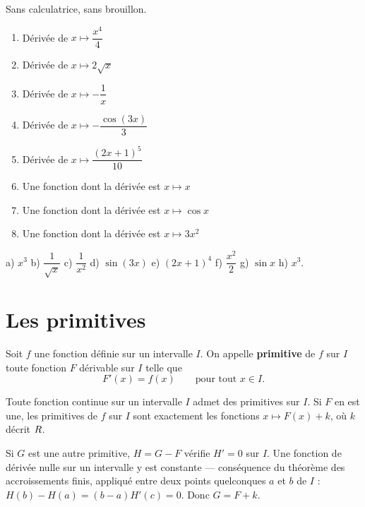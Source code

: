 \begin{automatismes}
Sans calculatrice, sans brouillon.

\begin{enumerate}[label=\textbf{\alph*)}, leftmargin=*, itemsep=0.25em]
  \item Dérivée de $x \mapsto \dfrac{x^{4}}{4}$
  \item Dérivée de $x \mapsto 2\sqrt{x}$
  \item Dérivée de $x \mapsto -\dfrac{1}{x}$
  \item Dérivée de $x \mapsto -\dfrac{\cos(3x)}{3}$
  \item Dérivée de $x \mapsto \dfrac{(2x+1)^{5}}{10}$
  \item Une fonction dont la dérivée est $x \mapsto x$
  \item Une fonction dont la dérivée est $x \mapsto \cos x$
  \item Une fonction dont la dérivée est $x \mapsto 3x^{2}$
\end{enumerate}
\end{automatismes}

\begin{corrige}[automatismes]
a) $x^{3}$ \quad b) $\dfrac{1}{\sqrt{x}}$ \quad c) $\dfrac{1}{x^{2}}$ \quad
d) $\sin(3x)$ \quad e) $(2x+1)^{4}$ \quad f) $\dfrac{x^{2}}{2}$ \quad
g) $\sin x$ \quad h) $x^{3}$.
\end{corrige}

\section{Les primitives}

\begin{definition}[primitive]
Soit $f$ une fonction définie sur un intervalle $I$. On appelle
\textbf{primitive} de $f$ sur $I$ toute fonction $F$ dérivable sur $I$ telle
que
\[
  F'(x) = f(x) \qquad \text{pour tout } x \in I .
\]
\end{definition}

\begin{theoreme}
Toute fonction continue sur un intervalle $I$ admet des primitives sur $I$.
Si $F$ en est une, les primitives de $f$ sur $I$ sont exactement les
fonctions $x \mapsto F(x)+k$, où $k$ décrit $R$.
\end{theoreme}

\begin{demonstration}
Si $G$ est une autre primitive, $H = G-F$ vérifie $H' = 0$ sur $I$. Une
fonction de dérivée nulle sur un intervalle y est constante — conséquence du
théorème des accroissements finis, appliqué entre deux points quelconques $a$
et $b$ de $I$ : $H(b)-H(a) = (b-a)H'(c) = 0$. Donc $G = F+k$.
\end{demonstration}

